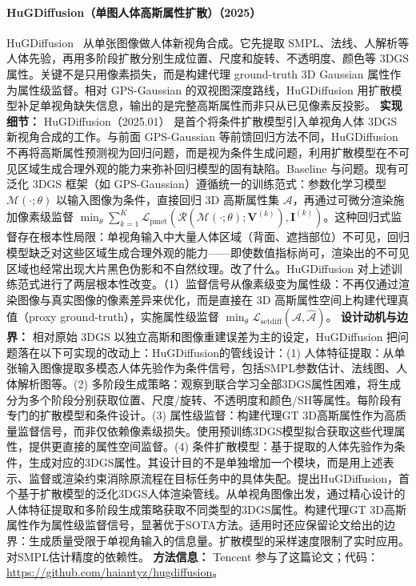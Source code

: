 \paragraph{HuGDiffusion（单图人体高斯属性扩散）（2025）}

HuGDiffusion~\cite{2501_15008} 从单张图像做人体新视角合成。它先提取 SMPL、法线、人解析等人体先验，再用多阶段扩散分别生成位置、尺度和旋转、不透明度、颜色等 3DGS 属性。关键不是只用像素损失，而是构建代理 ground-truth 3D Gaussian 属性作为属性级监督。相对 GPS-Gaussian 的双视图深度路线，HuGDiffusion 用扩散模型补足单视角缺失信息，输出的是完整高斯属性而非只从已见像素反投影。
\textbf{实现细节：} HuGDiffusion（2025.01） 是首个将条件扩散模型引入单视角人体 3DGS 新视角合成的工作。与前面 GPS-Gaussian 等前馈回归方法不同，HuGDiffusion 不再将高斯属性预测视为回归问题，而是视为条件生成问题，利用扩散模型在不可见区域生成合理外观的能力来弥补回归模型的固有缺陷。Baseline 与问题。现有可泛化 3DGS 框架（如 GPS-Gaussian）遵循统一的训练范式：参数化学习模型 $\mathcal{M}(\cdot;\theta)$ 以输入图像为条件，直接回归 3D 高斯属性集 $\mathcal{A}$，再通过可微分渲染施加像素级监督 $\min_\theta \sum_{k=1}^{K} \mathcal{L}_\mathrm{pmet}(\mathcal{R}(\mathcal{M}(\cdot;\theta); \mathbf{V}^{(k)}), \mathbf{I}^{(k)})$。这种回归式监督存在根本性局限：单视角输入中大量人体区域（背面、遮挡部位）不可见，回归模型缺乏对这些区域生成合理外观的能力——即使数值指标尚可，渲染出的不可见区域也经常出现大片黑色伪影和不自然纹理。改了什么。HuGDiffusion 对上述训练范式进行了两层根本性改变。（1）监督信号从像素级变为属性级：不再仅通过渲染图像与真实图像的像素差异来优化，而是直接在 3D 高斯属性空间上构建代理真值（proxy ground-truth），实施属性级监督 $\min_\theta \mathcal{L}_\mathrm{setdiff}(\mathcal{A}, \hat{\mathcal{A}})$。
\textbf{设计动机与边界：} 相对原始 3DGS 以独立高斯和图像重建误差为主的设定，HuGDiffusion 把问题落在以下可实现的改动上：HuGDiffusion的管线设计：(1) 人体特征提取：从单张输入图像提取多模态人体先验作为条件信号，包括SMPL参数估计、法线图、人体解析图等。(2) 多阶段生成策略：观察到联合学习全部3DGS属性困难，将生成分为多个阶段分别获取位置、尺度/旋转、不透明度和颜色/SH等属性。每阶段有专门的扩散模型和条件设计。(3) 属性级监督：构建代理GT 3D高斯属性作为高质量监督信号，而非仅依赖像素级损失。使用预训练3DGS模型拟合获取这些代理属性，提供更直接的属性空间监督。(4) 条件扩散模型：基于提取的人体先验作为条件，生成对应的3DGS属性。其设计目的不是单独增加一个模块，而是用上述表示、监督或渲染约束消除原流程在目标任务中的具体失配。提出HuGDiffusion，首个基于扩散模型的泛化3DGS人体渲染管线。从单视角图像出发，通过精心设计的人体特征提取和多阶段生成策略获取不同类型的3DGS属性。构建代理GT 3D高斯属性作为属性级监督信号，显著优于SOTA方法。适用时还应保留论文给出的边界：生成质量受限于单视角输入的信息量。扩散模型的采样速度限制了实时应用。对SMPL估计精度的依赖性。
\textbf{方法信息：} Tencent 参与了这篇论文；代码：\url{https://github.com/haiantyz/hugdiffusion}。



